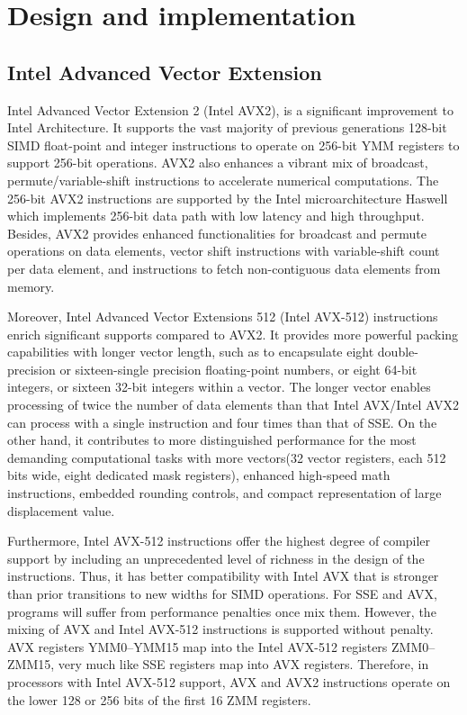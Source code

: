 \documentclass[sigconf]{acmart}
\begin{document}
\section{Design and implementation}\label{sec:design}
\subsection{Intel Advanced Vector Extension}
Intel Advanced Vector Extension 2 (Intel AVX2), is a significant improvement to Intel Architecture.
It supports the vast majority of previous generations 128-bit SIMD float-point
and integer instructions to operate on 256-bit YMM registers to support 256-bit operations.
%
AVX2 also enhances a vibrant mix of broadcast, permute/variable-shift instructions to accelerate
numerical computations. The 256-bit AVX2 instructions are supported by the Intel microarchitecture
Haswell which implements 256-bit data path with low latency and high throughput.
Besides, AVX2 provides enhanced functionalities for broadcast and permute operations on data elements,
vector shift instructions with variable-shift count per data element,
and instructions to fetch non-contiguous data elements from memory.

Moreover, Intel Advanced Vector Extensions 512 (Intel AVX-512) instructions
enrich significant supports compared to AVX2. It provides more powerful packing
capabilities with longer vector length, such as to encapsulate eight double-precision
or sixteen-single precision floating-point numbers,
or eight 64-bit integers, or sixteen 32-bit integers within a vector.
The longer vector enables processing of twice the number of data elements
than that Intel AVX/Intel AVX2 can
process with a single instruction and four times than that of SSE.
On the other hand, it contributes to more distinguished performance for the most
demanding computational tasks with more vectors(32 vector registers, each 512 bits wide,
eight dedicated mask registers), enhanced high-speed math instructions, embedded rounding controls,
and compact representation of large displacement value.

Furthermore, Intel AVX-512 instructions offer the highest degree of compiler
support by including an unprecedented level of richness in the design of the instructions.
Thus, it has better compatibility with Intel AVX that is stronger than
prior transitions to new widths for SIMD operations.
For SSE and AVX, programs will suffer from performance penalties once mix them.
However, the mixing of AVX and Intel AVX-512 instructions is supported without penalty.
AVX registers YMM0–YMM15 map into the Intel AVX-512 registers
ZMM0–ZMM15, very much like SSE registers map into AVX registers. Therefore, in processors with
Intel AVX-512 support, AVX and AVX2 instructions operate on the lower 128 or 256 bits of the first 16 ZMM registers.
\end{document}
